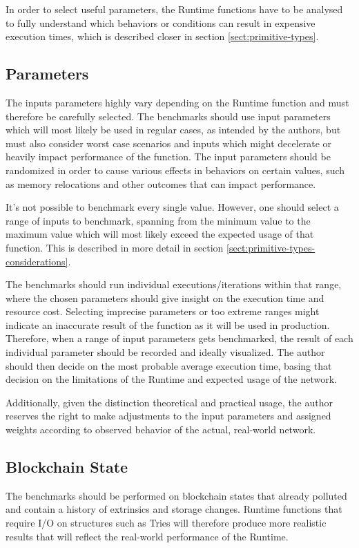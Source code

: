 \documentclass[11pt,a4paper]{article}
\begin{document}
In order to select useful parameters, the Runtime functions have to be analysed to fully
understand which behaviors or conditions can result in expensive execution times,
which is described closer in section \ref{sect:primitive-types}.

\subsection{Parameters}
The inputs parameters highly vary depending on the Runtime function and must therefore
be carefully selected. The benchmarks should use input parameters which will most likely be
used in regular cases, as intended by the authors, but must also consider worst case
scenarios and inputs which might decelerate or heavily impact performance of the function.
The input parameters should be randomized in order to cause various effects in behaviors
on certain values, such as memory relocations and other outcomes that can impact performance.
\newline

It's not possible to benchmark every single value. However, one should select a range
of inputs to benchmark, spanning from the minimum value
to the maximum value which will most likely exceed the expected usage of that function.
This is described in more detail in section \ref{sect:primitive-types-considerations}.
\newline

The benchmarks should run individual executions/iterations within that range, where the chosen parameters
should give insight on the execution time and resource cost. Selecting imprecise parameters
or too extreme ranges might indicate an inaccurate result of the function as it will be used in production.
Therefore, when a range of input parameters gets benchmarked, the result of each individual parameter
should be recorded and ideally visualized. The author should then decide on the most probable average
execution time, basing that decision on the limitations of the Runtime and expected usage of the network.
\newline

Additionally, given the distinction theoretical and practical usage, the author reserves the right
to make adjustments to the input parameters and assigned weights according to observed behavior
of the actual, real-world network.

\subsection{Blockchain State}
The benchmarks should be performed on blockchain states that already polluted and contain a history of
extrinsics and storage changes. Runtime functions that require I/O on structures
such as Tries will therefore produce more realistic results that will reflect the real-world
performance of the Runtime.
\end{document}
